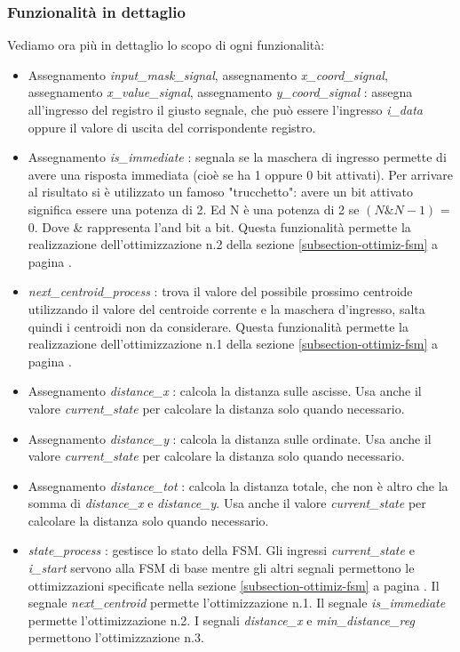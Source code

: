 \documentclass{article}
\begin{document}
\subsubsection{Funzionalità in dettaglio}
Vediamo ora più in dettaglio lo scopo di ogni funzionalità:
\begin{itemize}
    \item Assegnamento \textit{input\_mask\_signal}, assegnamento \textit{x\_coord\_signal}, assegnamento \textit{x\_value\_signal}, assegnamento \textit{y\_coord\_signal} : assegna all'ingresso del registro il giusto segnale, che può essere l'ingresso \textit{i\_data} oppure il valore di uscita del corrispondente registro.
    \item Assegnamento \textit{is\_immediate} : segnala se la maschera di ingresso permette di avere una risposta immediata (cioè se ha 1 oppure 0 bit attivati). Per arrivare al risultato si è utilizzato un famoso "trucchetto": avere un bit attivato significa essere una potenza di 2. Ed N è una potenza di 2 se \((N \& N-1)\) = 0. Dove \& rappresenta l'and bit a bit. Questa funzionalità permette la realizzazione dell'ottimizzazione n.2 della sezione \ref{subsection-ottimiz-fsm} a pagina \pageref{subsection-ottimiz-fsm}.
    \item \textit{next\_centroid\_process} : trova il valore del possibile prossimo centroide utilizzando il valore del centroide corrente e la maschera d'ingresso, salta quindi i centroidi non da considerare. Questa funzionalità permette la realizzazione dell'ottimizzazione n.1 della sezione \ref{subsection-ottimiz-fsm} a pagina \pageref{subsection-ottimiz-fsm}.
    \item Assegnamento \textit{distance\_x} : calcola la distanza sulle ascisse. Usa anche il valore \textit{current\_state} per calcolare la distanza solo quando necessario.
    \item Assegnamento \textit{distance\_y} : calcola la distanza sulle ordinate. Usa anche il valore \textit{current\_state} per calcolare la distanza solo quando necessario.
    \item Assegnamento \textit{distance\_tot} : calcola la distanza totale, che non è altro che la somma di \textit{distance\_x} e \textit{distance\_y}. Usa anche il valore \textit{current\_state} per calcolare la distanza solo quando necessario.
    \item \textit{state\_process} : gestisce lo stato della FSM. Gli ingressi \textit{current\_state} e \textit{i\_start} servono alla FSM di base mentre gli altri segnali permettono le ottimizzazioni specificate nella sezione \ref{subsection-ottimiz-fsm} a pagina \pageref{subsection-ottimiz-fsm}. Il segnale \textit{next\_centroid} permette l'ottimizzazione n.1. Il segnale \textit{is\_immediate} permette l'ottimizzazione n.2. I segnali \textit{distance\_x} e \textit{min\_distance\_reg} permettono l'ottimizzazione n.3.

\end{itemize}
\end{document}
